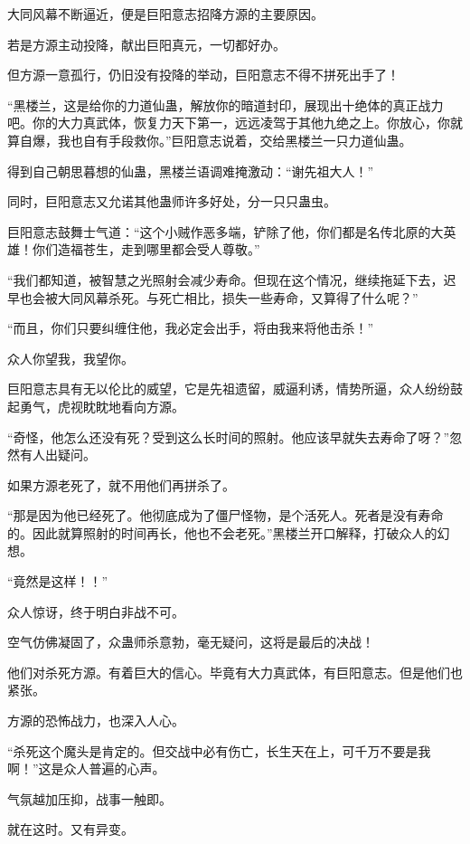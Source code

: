 
\begin{this_body}

大同风幕不断逼近，便是巨阳意志招降方源的主要原因。

若是方源主动投降，献出巨阳真元，一切都好办。

但方源一意孤行，仍旧没有投降的举动，巨阳意志不得不拼死出手了！

“黑楼兰，这是给你的力道仙蛊，解放你的暗道封印，展现出十绝体的真正战力吧。你的大力真武体，恢复力天下第一，远远凌驾于其他九绝之上。你放心，你就算自爆，我也自有手段救你。”巨阳意志说着，交给黑楼兰一只力道仙蛊。

得到自己朝思暮想的仙蛊，黑楼兰语调难掩激动：“谢先祖大人！”

同时，巨阳意志又允诺其他蛊师许多好处，分一只只蛊虫。

巨阳意志鼓舞士气道：“这个小贼作恶多端，铲除了他，你们都是名传北原的大英雄！你们造福苍生，走到哪里都会受人尊敬。”

“我们都知道，被智慧之光照射会减少寿命。但现在这个情况，继续拖延下去，迟早也会被大同风幕杀死。与死亡相比，损失一些寿命，又算得了什么呢？”

“而且，你们只要纠缠住他，我必定会出手，将由我来将他击杀！”

众人你望我，我望你。

巨阳意志具有无以伦比的威望，它是先祖遗留，威逼利诱，情势所逼，众人纷纷鼓起勇气，虎视眈眈地看向方源。

“奇怪，他怎么还没有死？受到这么长时间的照射。他应该早就失去寿命了呀？”忽然有人出疑问。

如果方源老死了，就不用他们再拼杀了。

“那是因为他已经死了。他彻底成为了僵尸怪物，是个活死人。死者是没有寿命的。因此就算照射的时间再长，他也不会老死。”黑楼兰开口解释，打破众人的幻想。

“竟然是这样！！”

众人惊讶，终于明白非战不可。

空气仿佛凝固了，众蛊师杀意勃，毫无疑问，这将是最后的决战！

他们对杀死方源。有着巨大的信心。毕竟有大力真武体，有巨阳意志。但是他们也紧张。

方源的恐怖战力，也深入人心。

“杀死这个魔头是肯定的。但交战中必有伤亡，长生天在上，可千万不要是我啊！”这是众人普遍的心声。

气氛越加压抑，战事一触即。

就在这时。又有异变。


\end{this_body}
